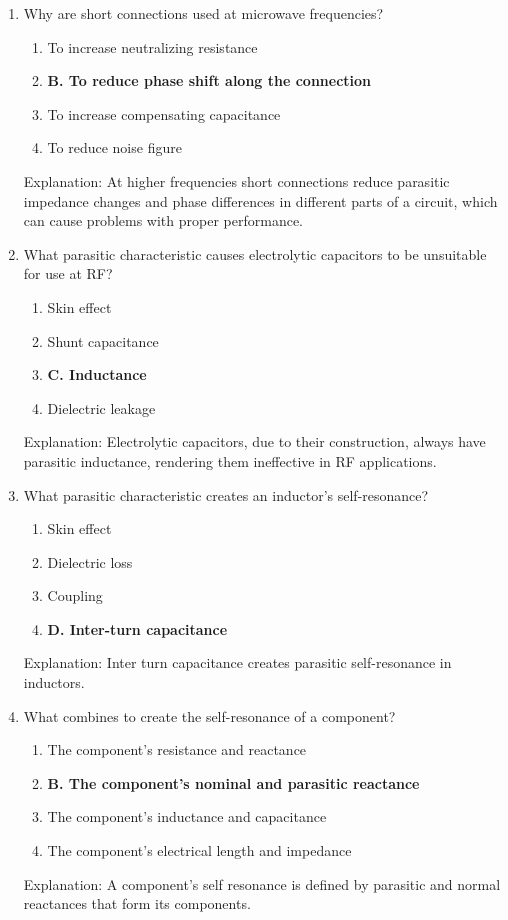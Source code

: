 \begin{enumerate}
    \item Why are short connections used at microwave frequencies?
      \begin{enumerate}
        \item  To increase neutralizing resistance
       \item \textbf{B. To reduce phase shift along the connection}
    \item  To increase compensating capacitance
     \item  To reduce noise figure
      \end{enumerate}
       \textcolor{myred}{Explanation:}
    At higher frequencies short connections reduce parasitic impedance changes and phase differences in different parts of a circuit, which can cause problems with proper performance.

   \item What parasitic characteristic causes electrolytic capacitors to be unsuitable for use at RF?
     \begin{enumerate}
      \item  Skin effect
      \item  Shunt capacitance
     \item \textbf{C. Inductance}
     \item  Dielectric leakage
     \end{enumerate}
    \textcolor{myred}{Explanation:}
    Electrolytic capacitors, due to their construction, always have parasitic inductance, rendering them ineffective in RF applications.
       
    \item What parasitic characteristic creates an inductor's self-resonance?
       \begin{enumerate}
       \item  Skin effect
       \item  Dielectric loss
       \item  Coupling
       \item \textbf{D. Inter-turn capacitance}
      \end{enumerate}
        \textcolor{myred}{Explanation:}
       Inter turn capacitance creates parasitic self-resonance in inductors.

      \item What combines to create the self-resonance of a component?
        \begin{enumerate}
       \item  The component's resistance and reactance
    \item \textbf{B. The component's nominal and parasitic reactance}
       \item  The component's inductance and capacitance
       \item  The component's electrical length and impedance
       \end{enumerate}
         \textcolor{myred}{Explanation:}
       A component's self resonance is defined by parasitic and normal reactances that form its components.
        

\end{enumerate}
